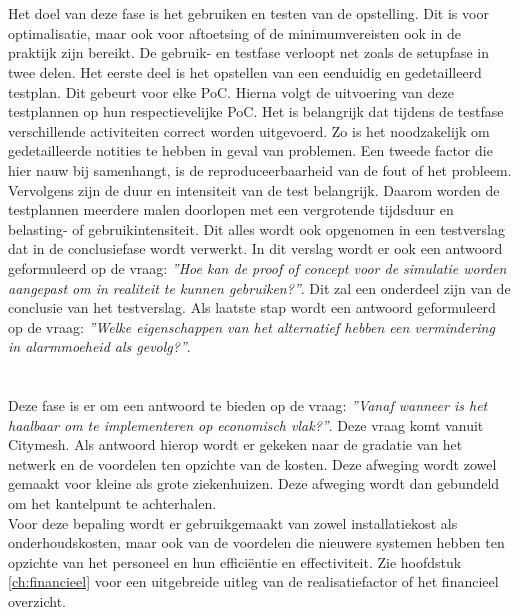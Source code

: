 \section{}
\label{sec:use}
Het doel van deze fase is het gebruiken en testen van de opstelling. Dit is voor optimalisatie, maar ook voor aftoetsing of de minimumvereisten ook in de praktijk zijn bereikt. De gebruik- en testfase verloopt net zoals de setupfase in twee delen. Het eerste deel is het opstellen van een eenduidig en gedetailleerd testplan. Dit gebeurt voor elke PoC. Hierna volgt de uitvoering van deze testplannen op hun respectievelijke PoC. Het is belangrijk dat tijdens de testfase verschillende activiteiten correct worden uitgevoerd. Zo is het noodzakelijk om gedetailleerde notities te hebben in geval van problemen. Een tweede factor die hier nauw bij samenhangt, is de reproduceerbaarheid van de fout of het probleem. Vervolgens zijn de duur en intensiteit van de test belangrijk. Daarom worden de testplannen meerdere malen doorlopen met een vergrotende tijdsduur en belasting- of gebruikintensiteit. Dit alles wordt ook opgenomen in een testverslag dat in de conclusiefase wordt verwerkt. In dit verslag wordt er ook een antwoord geformuleerd op de vraag: \textit{''Hoe kan de proof of concept voor de simulatie worden aangepast om in realiteit te kunnen gebruiken?''}. Dit zal een onderdeel zijn van de conclusie van het testverslag. Als laatste stap wordt een antwoord geformuleerd op de vraag: \textit{''Welke eigenschappen van het alternatief hebben een vermindering in alarmmoeheid als gevolg?''}.

\section{}
\label{sec:realisation}
Deze fase is er om een antwoord te bieden op de vraag: \textit{''Vanaf wanneer is het haalbaar om te implementeren op economisch vlak?''}. Deze vraag komt vanuit Citymesh. Als antwoord hierop wordt er gekeken naar de gradatie van het netwerk en de voordelen ten opzichte van de kosten. Deze afweging wordt zowel gemaakt voor kleine als grote ziekenhuizen. Deze afweging wordt dan gebundeld om het kantelpunt te achterhalen. \\ Voor deze bepaling wordt er gebruikgemaakt van zowel installatiekost als onderhoudskosten, maar ook van de voordelen die nieuwere systemen hebben ten opzichte van het personeel en hun efficiëntie en effectiviteit. 
Zie hoofdstuk \ref{ch:financieel} voor een uitgebreide uitleg van de realisatiefactor of het financieel overzicht.

